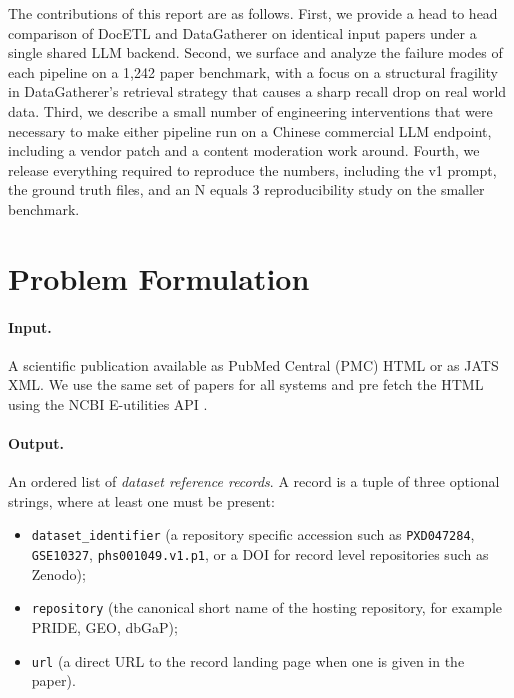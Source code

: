 \documentclass[sigconf,nonacm]{acmart}
\begin{document}
The contributions of this report are as follows. First, we provide a head to head comparison of DocETL \cite{shankar2024docetl} and DataGatherer \cite{marini2025datagatherer} on identical input papers under a single shared LLM backend. Second, we surface and analyze the failure modes of each pipeline on a 1{,}242 paper benchmark, with a focus on a structural fragility in DataGatherer's retrieval strategy that causes a sharp recall drop on real world data. Third, we describe a small number of engineering interventions that were necessary to make either pipeline run on a Chinese commercial LLM endpoint, including a vendor patch and a content moderation work around. Fourth, we release everything required to reproduce the numbers, including the v1 prompt, the ground truth files, and an N equals 3 reproducibility study on the smaller benchmark.

\section{Problem Formulation}
\label{sec:problem}

\paragraph{Input.} A scientific publication available as PubMed Central (PMC) HTML or as JATS XML. We use the same set of papers for all systems and pre fetch the HTML using the NCBI E-utilities API \cite{sayers2010entrez}.

\paragraph{Output.} An ordered list of \emph{dataset reference records}. A record is a tuple of three optional strings, where at least one must be present:
\begin{itemize}[leftmargin=1.2em, itemsep=0.2em]
    \item \texttt{dataset\_identifier} (a repository specific accession such as \texttt{PXD047284}, \texttt{GSE10327}, \texttt{phs001049.v1.p1}, or a DOI for record level repositories such as Zenodo);
    \item \texttt{repository} (the canonical short name of the hosting repository, for example PRIDE, GEO, dbGaP);
    \item \texttt{url} (a direct URL to the record landing page when one is given in the paper).
\end{itemize}
\end{document}
